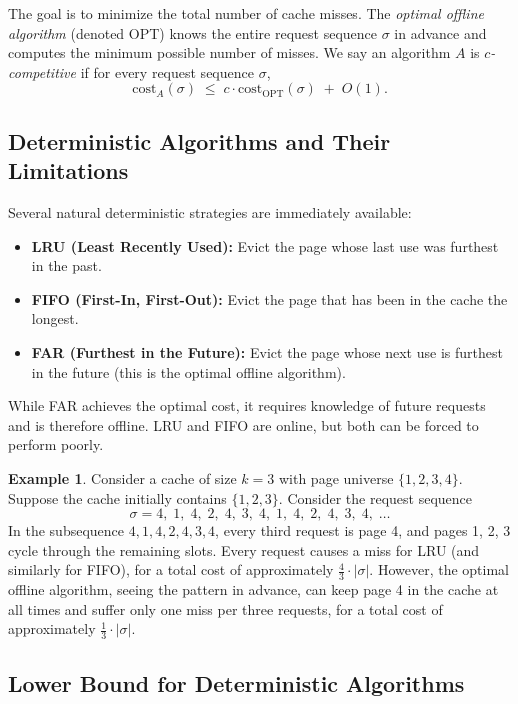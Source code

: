 \documentclass[twoside,12pt]{book}
\theoremstyle{plain}
\theoremstyle{definition}
\newtheorem{example}[theorem]{Example}
\theoremstyle{remark}
\begin{document}
The goal is to minimize the total number of cache misses.  The
\emph{optimal offline algorithm} (denoted OPT) knows the entire request
sequence $\sigma$ in advance and computes the minimum possible number of
misses.  We say an algorithm $A$ is \emph{$c$-competitive} if for every
request sequence $\sigma$,
\[
  \mathrm{cost}_A(\sigma) \;\le\; c \cdot \mathrm{cost}_{\mathrm{OPT}}(\sigma) \;+\; O(1).
\]

\subsection{Deterministic Algorithms and Their Limitations}

Several natural deterministic strategies are immediately
available:

\begin{itemize}[nosep]
  \item \textbf{LRU (Least Recently Used):} Evict the page whose last
        use was furthest in the past.
  \item \textbf{FIFO (First-In, First-Out):} Evict the page that has
        been in the cache the longest.
  \item \textbf{FAR (Furthest in the Future):} Evict the page whose next
        use is furthest in the future (this is the optimal offline
        algorithm).
\end{itemize}

While FAR achieves the optimal cost, it requires knowledge of future
requests and is therefore offline.  LRU and FIFO are online, but both
can be forced to perform poorly.

\begin{example}\label{ex:paging-adversary}
Consider a cache of size $k=3$ with page universe $\{1, 2, 3, 4\}$.
Suppose the cache initially contains $\{1, 2, 3\}$.  Consider the
request sequence
\[
  \sigma = 4,\; 1,\; 4,\; 2,\; 4,\; 3,\; 4,\; 1,\; 4,\; 2,\; 4,\; 3,\; 4,\; \ldots
\]
In the subsequence $4, 1, 4, 2, 4, 3, 4$, every third request is page 4,
and pages 1, 2, 3 cycle through the remaining slots.  Every request
causes a miss for LRU (and similarly for FIFO), for a total cost of
approximately $\tfrac{4}{3} \cdot |\sigma|$.  However, the optimal
offline algorithm, seeing the pattern in advance, can keep page 4 in the
cache at all times and suffer only one miss per three requests, for a
total cost of approximately $\tfrac{1}{3} \cdot |\sigma|$.
\end{example}

\subsection{Lower Bound for Deterministic Algorithms}
\end{document}
